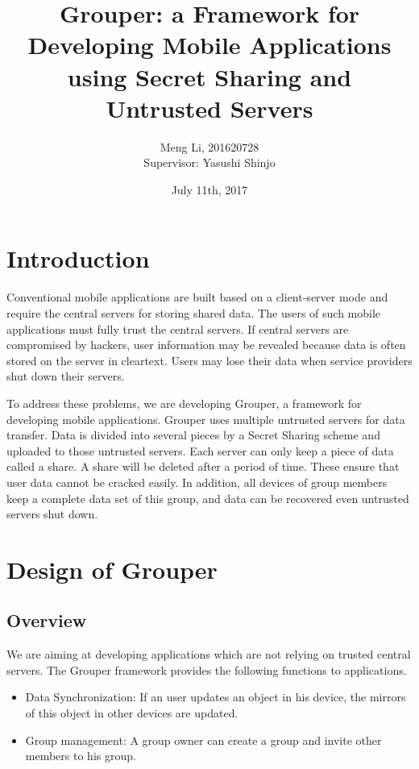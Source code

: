 \documentclass[twocolumn,10pt]{article}
\begin{document}
\small
\date{July 11th, 2017}

\title{\bf Grouper: a Framework for Developing Mobile Applications using Secret Sharing and Untrusted Servers}

\author{
	Meng Li, 201620728  
	\\ Supervisor: Yasushi Shinjo
}

\maketitle

\section{Introduction}

Conventional mobile applications are built based on a client-server mode and require the central servers for storing shared data. 
The users of such mobile applications must fully trust the central servers. 
If central servers are compromised by hackers, user information may be revealed because data is often stored on the server in cleartext. 
Users may lose their data when service providers shut down their servers. 

To address these problems, we are developing Grouper, a framework for developing mobile applications. 
Grouper uses multiple untrusted servers for data transfer.
Data is divided into several pieces by a Secret Sharing scheme and uploaded to those untrusted servers. 
Each server can only keep a piece of data called a share. A share will be deleted after a period of time. 
These ensure that user data cannot be cracked easily. 
In addition, all devices of group members keep a complete data set of this group, and data can be recovered even untrusted servers shut down.

\section{Design of Grouper}

\subsection{Overview}

We are aiming at developing applications which are not relying on trusted central servers. 
The Grouper framework provides the following functions to applications.

\begin{itemize}
	\setlength{\itemsep}{1pt}
	\setlength{\parskip}{0pt}
	\setlength{\parsep}{0pt}
	\item Data Synchronization: If an user updates an object in his device, the mirrors of this object in other devices are updated.
	\item Group management: A group owner can create a group and invite other members to his group.
\end{itemize}
\end{document}
